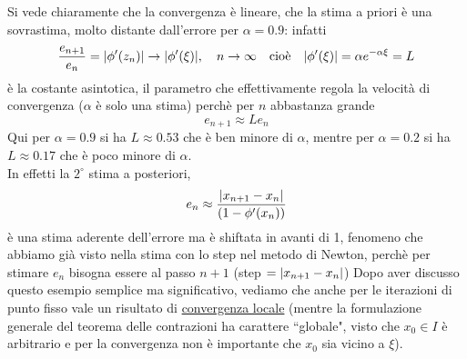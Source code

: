 \documentclass[12pt]{article}
\DeclarePairedDelimiter{\abs}{\lvert}{\rvert}
\begin{document}
Si vede chiaramente che la convergenza è lineare, che la stima a priori è una sovrastima, molto distante dall'errore per $\alpha = 0.9$: infatti
\[\frac{e_{n+1}}{e_n} = \abs{\phi'(z_n)} \to \abs{\phi'(\xi)}, \quad n \to \infty \quad \text{cioè} \quad \abs{\phi'(\xi)} = \alpha e^{-\alpha \xi} = L\]
è la costante asintotica, il parametro che effettivamente regola la velocità di convergenza ($\alpha$ è solo una stima) perchè per $n$ abbastanza grande
\[e_{n+1} \approx Le_n\]
Qui per $\alpha=0.9$ si ha $L \approx 0.53$ che è ben minore di $\alpha$, mentre per $\alpha=0.2$ si ha $L \approx 0.17$ che è poco minore di $\alpha$.\\
In effetti la $2^\circ$ stima a posteriori,
\[e_n \approx \frac{\abs{x_{n+1} - x_n}}{(1 - \phi'(x_n))}\]
è una stima aderente dell'errore ma è shiftata in avanti di 1, fenomeno che abbiamo già visto nella stima con lo step nel metodo di Newton, perchè per stimare $e_n$ bisogna essere al passo $n+1$ (step $=\abs{x_{n+1}-x_n}$)
\newline \newline
Dopo aver discusso questo esempio semplice ma significativo, vediamo che anche per le iterazioni di punto fisso vale un risultato di \uline{convergenza locale} (mentre la formulazione generale del teorema delle contrazioni ha
carattere ``globale", visto che $x_0 \in I$ è arbitrario e per la convergenza non è importante che $x_0$ sia vicino a $\xi$).
\end{document}
